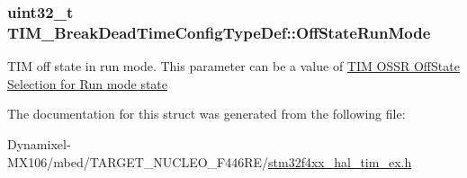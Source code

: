 \subsubsection[{\texorpdfstring{Off\+State\+Run\+Mode}{OffStateRunMode}}]{\setlength{\rightskip}{0pt plus 5cm}uint32\+\_\+t T\+I\+M\+\_\+\+Break\+Dead\+Time\+Config\+Type\+Def\+::\+Off\+State\+Run\+Mode}\hypertarget{struct_t_i_m___break_dead_time_config_type_def_a5e97751b5e397414e2a5120eb5cef7c6}{}\label{struct_t_i_m___break_dead_time_config_type_def_a5e97751b5e397414e2a5120eb5cef7c6}
T\+IM off state in run mode. This parameter can be a value of \hyperlink{group___t_i_m___o_s_s_r___off___state___selection__for___run__mode__state}{T\+IM O\+S\+SR Off\+State Selection for Run mode state} 

The documentation for this struct was generated from the following file\+:\begin{DoxyCompactItemize}
\item 
Dynamixel-\/\+M\+X106/mbed/\+T\+A\+R\+G\+E\+T\+\_\+\+N\+U\+C\+L\+E\+O\+\_\+\+F446\+R\+E/\hyperlink{stm32f4xx__hal__tim__ex_8h}{stm32f4xx\+\_\+hal\+\_\+tim\+\_\+ex.\+h}\end{DoxyCompactItemize}
